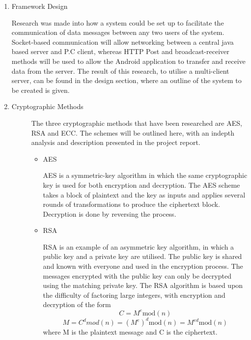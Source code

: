 \documentclass[a4paper,11pt]{article}
\begin{document}
\begin{enumerate}
  \item
  \begin{description}
    \item[Framework Design] 
  \end{description}
  Research was made into how a system could be set up to facilitate the communication of data messages between any two users of the system. Socket-based communication will allow networking between a central java based server and P.C client, whereas HTTP Post and broadcast-receiver methods will be used to allow the Android application to transfer and receive data from the server. The result of this research, to utilise a multi-client server, can be found in the design section, where an outline of the system to be created is given.
  \item
  \begin{description}
    \item[Cryptographic Methods] 
    The three cryptographic methods that have been researched are AES, RSA and ECC. The schemes will be outlined here, with an indepth analysis and description presented in the project report.
    \begin{itemize}
      \item
      \begin{description}
        \item[AES] 
      \end{description}
      AES is a symmetric-key algorithm in which the same cryptographic key is used for both encryption and decryption. The AES scheme takes a block of plaintext and the key as inputs and applies several rounds of transformations to produce the ciphertext block. Decryption is done by reversing the process.
      \item
      \begin{description}
        \item[RSA] 
      \end{description}
      RSA is an example of an asymmetric key algorithm, in which a public key and a private key are utilised. The public key is shared and known with
everyone and used in the encryption process. The messages encrypted with
the public key can only be decrypted using the matching private key. The RSA algorithm is based upon the difficulty of factoring large
integers, with encryption and decryption of the form 
\[ C = M^{e} \mathrm{mod}(n) \]
\[M = C^{d} mod(n) = (M^{e})^{d} \mathrm{mod}(n) = M^{ed} \mathrm{mod}(n) \]
where M is the plaintext message and C is the ciphertext.

\end{itemize}
\end{description}
\end{enumerate}
\end{document}
